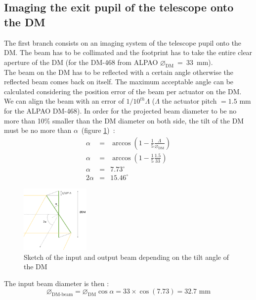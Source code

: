 \documentclass[12pt,a4paper]{article}
\begin{document}
\subsection{Imaging the exit pupil of the telescope onto the DM}
The first branch consists on an imaging system of the telescope pupil onto the DM. The beam has to be collimated and the footprint has to take the entire clear aperture of the DM (for the DM-468 from ALPAO $\diameter_{\text{DM}}$~=~33~mm).\\
The beam on the DM has to be reflected with a certain angle otherwise the reflected beam comes back on itself. The maximum acceptable angle can be calculated considering the position error of the beam per actuator on the DM. We can align the beam with an error of $1/10^{th} \Lambda$ ($\Lambda$ the actuator pitch $= 1.5$ mm for the ALPAO DM-468). In order for the projected beam diameter to be no more than 10\% smaller than the DM diameter on both side, the tilt of the DM must be no more than $\alpha$~(figure \ref{fig:OAP0_DM_diam_beam_diam})~:
\begin{eqnarray}
	\alpha &= &\arccos\left(1-\frac{1}{5}\frac{\Lambda}{\diameter_{\text{DM}}}\right)\\
	\alpha &= &\arccos\left(1-\frac{1}{5}\frac{1.5}{33}\right)\\
	\alpha &= &7.73^{ \circ}\\
	2\alpha &= &15.46^{ \circ}
\end{eqnarray}

\begin{figure}[H]
	\begin{center}
		\includegraphics[width=0.3\textwidth]{images/OAP0_DM_diam_beam_diam.PNG}
		\caption{Sketch of the input and output beam depending on the tilt angle of the DM}\label{fig:OAP0_DM_diam_beam_diam}
	\end{center}
\end{figure}
The input beam diameter is then :
\begin{equation}
	\diameter_{\text{DM-beam}} = \diameter_{\text{DM}} \cos{\alpha} = 33\times \cos{(7.73)} = 32.7 \text{ mm}
\end{equation}
\end{document}
